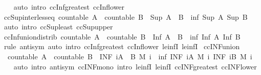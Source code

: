 \begin{isabellebody}
%
\isadelimproof
\ \ %
\endisadelimproof
%
\isatagproof
{}\isamarkupfalse%
\ {\isacharparenleft}auto\ intro{\isacharcolon}\ ccInf{\isacharunderscore}greatest\ ccInf{\isacharunderscore}lower{\isacharparenright}%
\endisatagproof
{\isafoldproof}%
%
\isadelimproof
\isanewline
%
\endisadelimproof
\isanewline
{}\isamarkupfalse%
\ ccSup{\isacharunderscore}inter{\isacharunderscore}less{\isacharunderscore}eq{\isacharcolon}\ {\isachardoublequoteopen}countable\ A\ {\isasymLongrightarrow}\ countable\ B\ {\isasymLongrightarrow}\ Sup\ {\isacharparenleft}A\ {\isasyminter}\ B{\isacharparenright}\ {\isasymle}\ inf\ {\isacharparenleft}Sup\ A{\isacharparenright}\ {\isacharparenleft}Sup\ B{\isacharparenright}{\isachardoublequoteclose}\isanewline
%
\isadelimproof
\ \ %
\endisadelimproof
%
\isatagproof
{}\isamarkupfalse%
\ {\isacharparenleft}auto\ intro{\isacharcolon}\ ccSup{\isacharunderscore}least\ ccSup{\isacharunderscore}upper{\isacharparenright}%
\endisatagproof
{\isafoldproof}%
%
\isadelimproof
\isanewline
%
\endisadelimproof
\isanewline
{}\isamarkupfalse%
\ ccInf{\isacharunderscore}union{\isacharunderscore}distrib{\isacharcolon}\ {\isachardoublequoteopen}countable\ A\ {\isasymLongrightarrow}\ countable\ B\ {\isasymLongrightarrow}\ Inf\ {\isacharparenleft}A\ {\isasymunion}\ B{\isacharparenright}\ {\isacharequal}\ inf\ {\isacharparenleft}Inf\ A{\isacharparenright}\ {\isacharparenleft}Inf\ B{\isacharparenright}{\isachardoublequoteclose}\isanewline
%
\isadelimproof
\ \ %
\endisadelimproof
%
\isatagproof
{}\isamarkupfalse%
\ {\isacharparenleft}rule\ antisym{\isacharparenright}\ {\isacharparenleft}auto\ intro{\isacharcolon}\ ccInf{\isacharunderscore}greatest\ ccInf{\isacharunderscore}lower\ le{\isacharunderscore}infI{}\ le{\isacharunderscore}infI{}{\isacharparenright}%
\endisatagproof
{\isafoldproof}%
%
\isadelimproof
\isanewline
%
\endisadelimproof
\isanewline
{}\isamarkupfalse%
\ ccINF{\isacharunderscore}union{\isacharcolon}\isanewline
\ \ {\isachardoublequoteopen}countable\ A\ {\isasymLongrightarrow}\ countable\ B\ {\isasymLongrightarrow}\ {\isacharparenleft}INF\ i{\isasymin}A\ {\isasymunion}\ B{\isachardot}\ M\ i{\isacharparenright}\ {\isacharequal}\ inf\ {\isacharparenleft}INF\ i{\isasymin}A{\isachardot}\ M\ i{\isacharparenright}\ {\isacharparenleft}INF\ i{\isasymin}B{\isachardot}\ M\ i{\isacharparenright}{\isachardoublequoteclose}\isanewline
%
\isadelimproof
\ \ %
\endisadelimproof
%
\isatagproof
{}\isamarkupfalse%
\ {\isacharparenleft}auto\ intro{\isacharbang}{\isacharcolon}\ antisym\ ccINF{\isacharunderscore}mono\ intro{\isacharcolon}\ le{\isacharunderscore}infI{}\ le{\isacharunderscore}infI{}\ ccINF{\isacharunderscore}greatest\ ccINF{\isacharunderscore}lower{\isacharparenright}%

\end{isabellebody}
